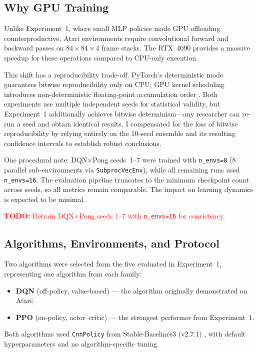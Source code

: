 \subsection{Why GPU Training}
\label{sec:why-gpu}

Unlike Experiment~1, where small MLP policies made GPU offloading
counterproductive, Atari environments require convolutional forward
and backward passes on $84\times84\times4$ frame stacks. The RTX~4090
provides a massive speedup for these operations compared to CPU-only
execution.

This shift has a reproducibility trade-off. PyTorch's deterministic
mode guarantees bitwise reproducibility only on CPU; GPU kernel
scheduling introduces non-deterministic floating-point accumulation
order \citep{pytorch_reproducibility}. Both experiments use multiple
independent seeds for statistical validity, but Experiment~1
additionally achieves bitwise determinism---any researcher can re-run a
seed and obtain identical results. I compensated for the loss of bitwise
reproducibility by relying entirely on the 10-seed ensemble and its
resulting confidence intervals to establish robust conclusions.

One procedural note: DQN$\times$Pong seeds~1--7 were trained with
\texttt{n\_envs=8} (8 parallel sub-environments via
\texttt{SubprocVecEnv}), while all remaining runs used
\texttt{n\_envs=16}. The evaluation pipeline truncates to the minimum
checkpoint count across seeds, so all metrics remain comparable. The
impact on learning dynamics is expected to be minimal. 

\textcolor{red}{\textbf{TODO:} Retrain DQN$\times$Pong seeds 1--7 with \texttt{n\_envs=16} for consistency.}

\subsection{Algorithms, Environments, and Protocol}
\label{sec:atari-protocol}

Two algorithms were selected from the five evaluated in Experiment~1,
representing one algorithm from each family:
\begin{itemize}
  \item \textbf{DQN} (off-policy, value-based) \citep{mnih2015human}
        --- the algorithm originally demonstrated on Atari;
  \item \textbf{PPO} (on-policy, actor--critic)
        \citep{schulman2017ppo} --- the strongest performer from
        Experiment~1.
\end{itemize}
Both algorithms used \texttt{CnnPolicy} from Stable-Baselines3
(v2.7.1) \citep{raffin2021sb3}, with default hyperparameters and no
algorithm-specific tuning.

